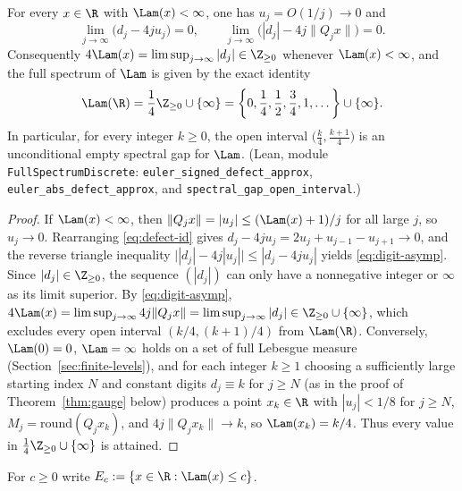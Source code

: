 \begin{theorem}\label{thm:full-spectrum}
For every $x\in\R$ with $\Lam(x)<\infty$, one has $u_j=O(1/j)\to0$ and
\begin{equation}\label{eq:digit-asymp}
\lim_{j\to\infty}\bigl(d_j-4ju_j\bigr)=0,\qquad
\lim_{j\to\infty}\bigl(|d_j|-4j\|Q_jx\|\bigr)=0.
\end{equation}
Consequently $4\Lam(x)=\limsup_{j\to\infty}|d_j|\in\Z_{\ge0}$ whenever
$\Lam(x)<\infty$, and the full spectrum of $\Lam$ is given by the exact identity
\begin{equation}\label{eq:full-spectrum}
\Lam(\R)=\frac14\Z_{\ge0}\cup\{\infty\}
=\left\{0,\frac14,\frac12,\frac34,1,\dots\right\}\cup\{\infty\}.
\end{equation}
In particular, for every integer $k\ge0$, the open interval
$\bigl(\frac{k}{4},\frac{k+1}{4}\bigr)$ is an unconditional empty spectral gap
for $\Lam$.
(Lean, module \texttt{FullSpectrumDiscrete}:
\texttt{euler\_\allowbreak signed\_\allowbreak defect\_\allowbreak approx},
\texttt{euler\_\allowbreak abs\_\allowbreak defect\_\allowbreak approx}, and
\texttt{spectral\_\allowbreak gap\_\allowbreak open\_\allowbreak interval}.)
\end{theorem}

\begin{proof}
If $\Lam(x)<\infty$, then $\|Q_jx\|=|u_j|\le(\Lam(x)+1)/j$ for all large $j$,
so $u_j\to0$. Rearranging \eqref{eq:defect-id} gives
$d_j-4ju_j=2u_j+u_{j-1}-u_{j+1}\to0$, and the reverse triangle inequality
$\bigl||d_j|-4j|u_j|\bigr|\le|d_j-4ju_j|$ yields \eqref{eq:digit-asymp}.
Since $|d_j|\in\Z_{\ge0}$, the sequence $(|d_j|)$ can only have a nonnegative
integer or $\infty$ as its limit superior. By \eqref{eq:digit-asymp},
$4\Lam(x)=\limsup_{j\to\infty}4j\|Q_jx\|=\limsup_{j\to\infty}|d_j|\in\Z_{\ge0}\cup\{\infty\}$,
which excludes every open interval $(k/4,(k+1)/4)$ from $\Lam(\R)$.
Conversely, $\Lam(0)=0$, $\Lam=\infty$ holds on a set of full Lebesgue measure
(Section~\ref{sec:finite-levels}), and for each integer $k\ge1$ choosing a
sufficiently large starting index $N$ and constant digits $d_j\equiv k$ for
$j\ge N$ (as in the proof of Theorem~\ref{thm:gauge} below) produces a point
$x_k\in\R$ with $|u_j|<1/8$ for $j\ge N$, $M_j=\mathrm{round}(Q_jx_k)$, and
$4j\|Q_jx_k\|\to k$, so $\Lam(x_k)=k/4$. Thus every value in
$\frac14\Z_{\ge0}\cup\{\infty\}$ is attained.
\end{proof}

For $c\ge0$ write $E_c:=\{x\in\R:\Lam(x)\le c\}$.

